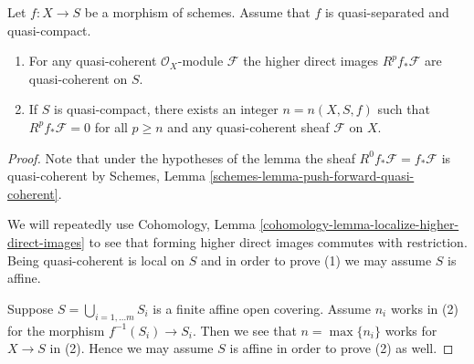 \begin{lemma}
\label{lemma-quasi-coherence-higher-direct-images}
Let $f : X \to S$ be a morphism of schemes.
Assume that $f$ is quasi-separated and quasi-compact.
\begin{enumerate}
\item For any quasi-coherent $\mathcal{O}_X$-module $\mathcal{F}$ the
higher direct images $R^pf_*\mathcal{F}$ are quasi-coherent on $S$.
\item If $S$ is quasi-compact, there exists an integer $n = n(X, S, f)$
such that $R^pf_*\mathcal{F} = 0$ for all $p \geq n$ and any
quasi-coherent sheaf $\mathcal{F}$ on $X$.
\end{enumerate}
\end{lemma}

\begin{proof}
Note that under the hypotheses of the lemma the sheaf
$R^0f_*\mathcal{F} = f_*\mathcal{F}$ is quasi-coherent by
Schemes, Lemma \ref{schemes-lemma-push-forward-quasi-coherent}.

\medskip\noindent
We will repeatedly use
Cohomology, Lemma \ref{cohomology-lemma-localize-higher-direct-images}
to see that forming higher direct images commutes with restriction.
Being quasi-coherent is local on $S$ and in order to prove (1) we
may assume $S$ is affine.

\medskip\noindent
Suppose $S = \bigcup_{i = 1, \ldots m} S_i$ is a finite affine open covering.
Assume $n_i$ works in (2) for the morphism $f^{-1}(S_i) \to S_i$.
Then we see that $n = \max\{n_i\}$ works for $X \to S$ in (2).
Hence we may assume $S$ is affine in order to prove (2) as well.


\end{proof}
